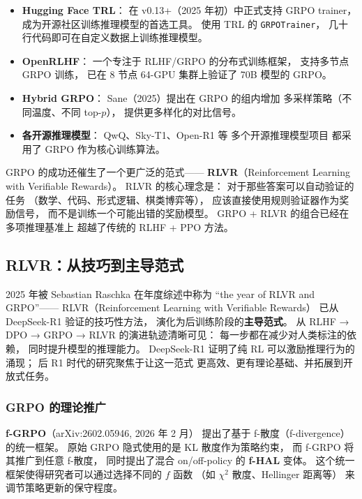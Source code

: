 \begin{itemize}[noitemsep]
  \item \textbf{Hugging Face TRL}：
        在 v0.13+（2025 年初）中正式支持 GRPO trainer，
        成为开源社区训练推理模型的首选工具。
        使用 TRL 的 \texttt{GRPOTrainer}，
        几十行代码即可在自定义数据上训练推理模型。
  \item \textbf{OpenRLHF}：
        一个专注于 RLHF/GRPO 的分布式训练框架，
        支持多节点 GRPO 训练，
        已在 8 节点 64-GPU 集群上验证了 70B 模型的 GRPO。
  \item \textbf{Hybrid GRPO}：
        Sane（2025）提出在 GRPO 的组内增加
        多采样策略（不同温度、不同 top-$p$），
        提供更多样化的对比信号。
  \item \textbf{各开源推理模型}：
        QwQ、Sky-T1、Open-R1 等
        多个开源推理模型项目
        都采用了 GRPO 作为核心训练算法。
\end{itemize}

GRPO 的成功还催生了一个更广泛的范式——
\textbf{RLVR}（Reinforcement Learning with Verifiable Rewards）。
RLVR 的核心理念是：
对于那些答案可以自动验证的任务
（数学、代码、形式逻辑、棋类博弈等），
应该直接使用规则验证器作为奖励信号，
而不是训练一个可能出错的奖励模型。
GRPO + RLVR 的组合已经在多项推理基准上
超越了传统的 RLHF + PPO 方法。

\subsection{RLVR：从技巧到主导范式}

2025 年被 Sebastian Raschka 在年度综述中称为
``the year of RLVR and GRPO''——
RLVR（Reinforcement Learning with Verifiable Rewards）
已从 DeepSeek-R1 验证的技巧性方法，
演化为后训练阶段的\textbf{主导范式}。
从 RLHF → DPO → GRPO → RLVR 的演进轨迹清晰可见：
每一步都在减少对人类标注的依赖，
同时提升模型的推理能力。
DeepSeek-R1 证明了纯 RL 可以激励推理行为的涌现；
后 R1 时代的研究聚焦于让这一范式
更高效、更有理论基础、并拓展到开放式任务。

\subsubsection{GRPO 的理论推广}


\textbf{f-GRPO}（arXiv:2602.05946, 2026 年 2 月）
提出了基于 f-散度（f-divergence）的统一框架。
原始 GRPO 隐式使用的是 KL 散度作为策略约束，
而 f-GRPO 将其推广到任意 f-散度，
同时提出了混合 on/off-policy 的 \textbf{f-HAL} 变体。
这个统一框架使得研究者可以通过选择不同的 $f$ 函数
（如 $\chi^2$ 散度、Hellinger 距离等）
来调节策略更新的保守程度。

